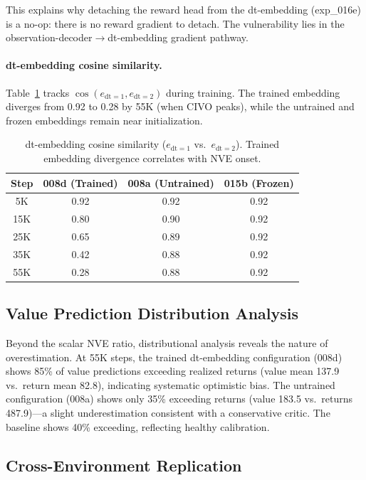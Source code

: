 \documentclass[10pt,letterpaper]{article}
\begin{document}
This explains why detaching the reward head from the dt-embedding (exp\_016e) is a no-op: there is no reward gradient to detach.
The vulnerability lies in the observation-decoder$\to$dt-embedding gradient pathway.

\paragraph{dt-embedding cosine similarity.}
Table~\ref{tab:cosine} tracks $\cos(e_{\text{dt}=1}, e_{\text{dt}=2})$ during training.
The trained embedding diverges from 0.92 to 0.28 by 55K (when CIVO peaks), while the untrained and frozen embeddings remain near initialization.

\begin{table}[h]
\centering
\caption{dt-embedding cosine similarity ($e_{\text{dt}=1}$ vs.\ $e_{\text{dt}=2}$). Trained embedding divergence correlates with NVE onset.}
\label{tab:cosine}
\begin{tabular}{cccc}
\toprule
\textbf{Step} & \textbf{008d (Trained)} & \textbf{008a (Untrained)} & \textbf{015b (Frozen)} \\
\midrule
5K & 0.92 & 0.92 & 0.92 \\
15K & 0.80 & 0.90 & 0.92 \\
25K & 0.65 & 0.89 & 0.92 \\
35K & 0.42 & 0.88 & 0.92 \\
55K & 0.28 & 0.88 & 0.92 \\
\bottomrule
\end{tabular}
\end{table}

\subsection{Value Prediction Distribution Analysis}

Beyond the scalar NVE ratio, distributional analysis reveals the nature of overestimation.
At 55K steps, the trained dt-embedding configuration (008d) shows 85\% of value predictions exceeding realized returns (value mean 137.9 vs.\ return mean 82.8), indicating systematic optimistic bias.
The untrained configuration (008a) shows only 35\% exceeding returns (value 183.5 vs.\ returns 487.9)---a slight underestimation consistent with a conservative critic.
The baseline shows 40\% exceeding, reflecting healthy calibration.

\subsection{Cross-Environment Replication}
\end{document}
